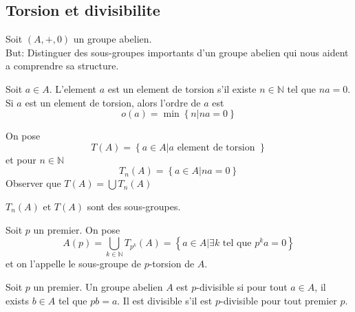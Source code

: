 \documentclass[../main.tex]{subfiles}
\begin{document}
\subsection{Torsion et divisibilite}
Soit $( A,+,0) $ un groupe abelien.\\
But: Distinguer des sous-groupes importants d'un groupe abelien qui nous aident a comprendre sa structure.\\
\begin{defn}
	Soit $a\in A$. L'element $a$ est un element de torsion s'il existe $n \in \mathbb{N}$ tel que $na= 0$.\\
	Si $a$ est un element de torsion, alors l'ordre de $a$ est
	\[ 
	o( a) = \min \left\{ n| na =0 \right\} 
	\]
	 	
\end{defn}
\begin{defn}
	On pose 
	\[ 
	T( A) = \left\{ a \in A| a \text{ element de torsion }  \right\} 
	\]
	et pour $n \in \mathbb{N}$ 
	\[ 
	T_n( A) = \left\{ a\in A | na = 0 \right\} 
	\]
	Observer que $T( A) = \bigcup T_n( A) $ 	
\end{defn}
\begin{lemma}
$T_n( A) $ et $T( A) $ sont des sous-groupes.
\end{lemma}
\begin{defn}
Soit $p$ un premier. On pose
\[ 
A( p) = \bigcup_{k\in \mathbb{N}} T_{p^{k}} ( A) = \left\{ a\in A| \exists k \text{ tel que } p^{k}a= 0 \right\} 
\]
et on l'appelle le sous-groupe de $p$-torsion de $A$.
\end{defn}
\begin{defn}
	Soit $p$ un premier. Un groupe abelien $A$ est $p$-divisible si pour tout $a\in A$, il exists $b \in A$ tel que $pb= a$. Il est divisible s'il est $p$-divisible pour tout premier $p$.
\end{defn}
\end{document}
